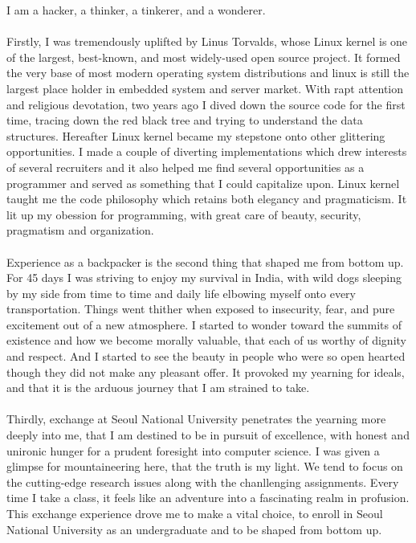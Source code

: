 \documentclass{article}
\begin{document}
I am a hacker, a thinker, a tinkerer, and a wonderer. \\
\\
Firstly, I was tremendously uplifted by Linus Torvalds, whose Linux kernel is one of the largest, best-known, and most widely-used open source project. It formed the very base of most modern operating system distributions and linux is still the largest place holder in embedded system and server market. With rapt attention and religious devotation, two years ago I dived down the source code for the first time, tracing down the red black tree and trying to understand the data structures. Hereafter Linux kernel became my stepstone onto other glittering opportunities. I made a couple of diverting implementations which drew interests of several recruiters and it also helped me find several opportunities as a programmer and served as something that I could capitalize upon. Linux kernel taught me the code philosophy which retains both elegancy and pragmaticism. It lit up my obession for programming, with great care of beauty, security, pragmatism and organization. \\
\\
Experience as a backpacker is the second thing that shaped me from bottom up. For 45 days I was striving to enjoy my survival in India, with wild dogs sleeping by my side from time to time and daily life elbowing myself onto every transportation. Things went thither when exposed to insecurity, fear, and pure excitement out of a new atmosphere. I started to wonder toward the summits of existence and how we become morally valuable, that each of us worthy of dignity and respect. And I started to see the beauty in people who were so open hearted though they did not make any pleasant offer. It provoked my yearning for ideals, and that it is the arduous journey that I am strained to take.\\
\\
Thirdly, exchange at Seoul National University penetrates the yearning more deeply into me, that I am destined to be in pursuit of excellence, with honest and unironic hunger for a prudent foresight into computer science. I was given a glimpse for mountaineering here, that the truth is my light. We tend to focus on the cutting-edge research issues along with the chanllenging assignments. Every time I take a class, it feels like an adventure into a fascinating realm in profusion. This exchange experience drove me to make a vital choice, to enroll in Seoul National University as an undergraduate and to be shaped from bottom up. \\
\end{document}
